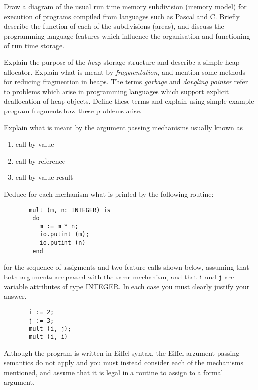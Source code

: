 \begin{questions}
\begin{subquestions}
\end{subquestions}

\question

\begin{subquestions}
\subquestion
Draw a diagram of the usual run time memory
subdivision (memory model) for execution of
programs compiled from languages such as
Pascal and C.  Briefly describe the function of each
of the subdivisions (areas), and discuss
the programming language features which influence
the organisation and functioning of run time storage.

\subquestion
Explain the purpose of the {\em heap} storage structure and
describe a simple heap allocator.  Explain what is 
meant by {\em fragmentation}, and mention some methods
for reducing fragmention in heaps.  The terms
{\em garbage\/} and {\em dangling pointer} refer to
problems which arise in programming languages which
support explicit deallocation of heap objects. Define
these terms and explain using simple example program
fragments how these problems arise.

\subquestion

        Explain what is meant by the argument passing mechanisms usually
        known as
                \begin{enumerate}
                \item call-by-value
                \item call-by-reference
                \item call-by-value-result
                \end{enumerate}
        Deduce for each mechanism what is printed by the 
	following routine:
\begin{verbatim}
       mult (m, n: INTEGER) is
        do
          m := m * n;
          io.putint (m);
          io.putint (n)
        end
\end{verbatim}   
	for the sequence of assigments and two feature calls
        shown below, assuming that both arguments are
	passed with the same mechanism, and that \verb"i" and
	\verb"j" are variable attributes of type INTEGER.
        In each case you must clearly justify your answer.
\begin{verbatim}
       i := 2;
       j := 3;
       mult (i, j);
       mult (i, i)
\end{verbatim}
Although the program is written in Eiffel syntax, the Eiffel
argument-passing semantics do not apply and you must
instead consider each of the mechanisms mentioned, and assume
that it is legal in a routine to assign to a formal argument.

\end{subquestions}
\end{questions}



